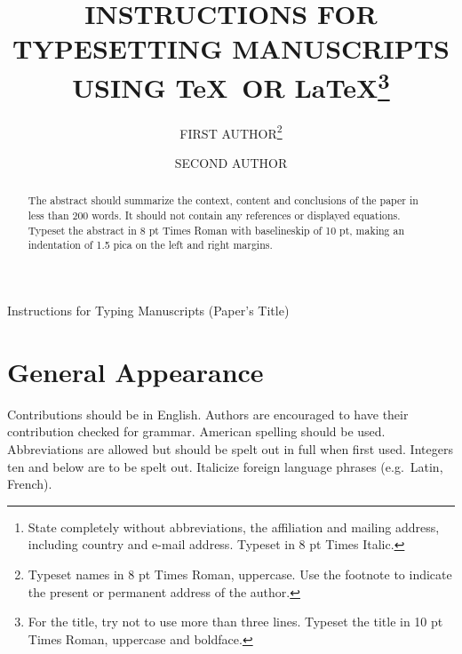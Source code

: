 \documentclass{ws-mpla}
\begin{document}
{Instructions for Typing Manuscripts (Paper's Title)}

\catchline{}{}{}{}{}

\title{INSTRUCTIONS FOR TYPESETTING MANUSCRIPTS\\
USING \TeX\ OR \LaTeX\footnote{For the title, try not to use more than
three lines. Typeset the title in 10 pt Times Roman, uppercase and
boldface.}
}

\author{\footnotesize FIRST AUTHOR\footnote{
Typeset names in 8 pt Times Roman, uppercase. Use the footnote to
indicate the present or permanent address of the author.}}

\address{University Department, University Name, Address\\
City, State ZIP/Zone,
Country\footnote{State completely without abbreviations, the
affiliation and mailing address, including country and e-mail address.
Typeset in 8 pt Times Italic.}\\
author@emailaddress}

\author{SECOND AUTHOR}

\address{Group, Laboratory, Address\\
City, State ZIP/Zone, Country
}

\maketitle


\begin{abstract}
The abstract should summarize the context, content and conclusions of
the paper in less than 200 words. It should not contain any references
or displayed equations. Typeset the abstract in 8 pt Times Roman with
baselineskip of 10 pt, making an indentation of 1.5 pica on the left
and right margins.

\end{abstract}


\section{General Appearance}	

Contributions should be in English. Authors are encouraged to have
their contribution checked for grammar.  American spelling should be
used. Abbreviations are allowed but should be spelt out in full when
first used. Integers ten and below are to be spelt out. Italicize
foreign language phrases (e.g.~Latin, French).
\end{document}
